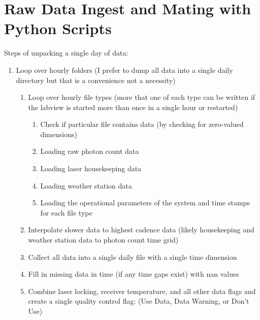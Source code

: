 \newpage




\section{Raw Data Ingest and Mating with Python Scripts}


Steps of unpacking a single day of data:
\begin{enumerate}
	\item{Loop over hourly folders (I prefer to dump all data into a single daily directory but that is a convenience not a necessity)}
	\begin{enumerate}
		\item{Loop over hourly file types (more that one of each type can be written if the labview is started more than once in a single hour or restarted)}
			\begin{enumerate}
				\item{Check if particular file contains data (by checking for zero-valued dimensions)}
				\item{Loading raw photon count data}
				\item{Loading laser housekeeping data}
				\item{Loading weather station data}
				\item{Loading the operational parameters of the system and time stamps for each file type}
			\end{enumerate}
		\item{Interpolate slower data to highest cadence data (likely housekeeping and weather station data to photon count time grid)}
		\item{Collect all data into a single daily file with a single time dimension}
		\item{Fill in missing data in time (if any time gaps exist) with nan values}
		\item{Combine laser locking, receiver temperature, and all other data flags and create a single quality control flag: (Use Data, Data Warning, or Don't Use)}
	\end{enumerate}
\end{enumerate}


\newpage

